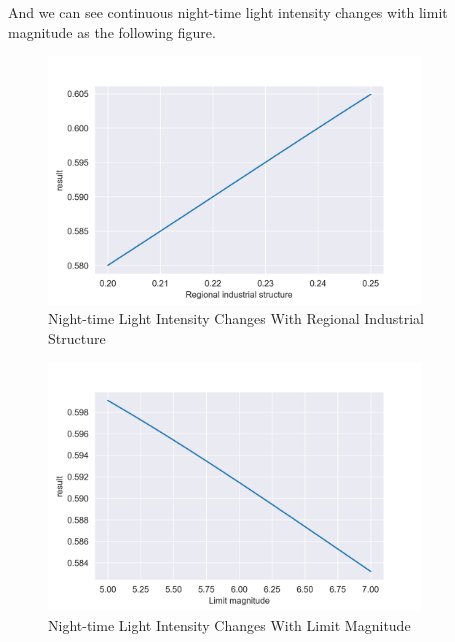 And we can see continuous night-time light intensity changes with limit magnitude as the following figure.
\begin{figure}[H]\centering
    \includegraphics[width=0.88\textwidth]{figures/Regional_industrial_structure.png}
    \caption{Night-time Light Intensity Changes With Regional Industrial Structure} \label{fig:figure7}
\end{figure}

\begin{figure}[H]\centering
    \includegraphics[width=0.88\textwidth]{figures/Limit_magnitude.png}
    \caption{Night-time Light Intensity Changes With Limit Magnitude} \label{fig:figure8}
\end{figure}